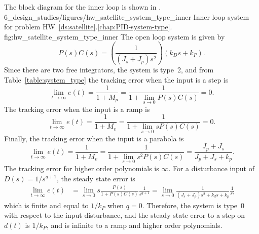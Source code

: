 
The block diagram for the inner loop is shown in .
	{6_design_studies/figures/hw_satellite_system_type_inner}
	{Inner loop system for problem HW~\ref{ds:satellite}.\ref{chap:PID-system-type}.}
	{fig:hw_satellite_system_type_inner}
The open loop system is given by
\[
P(s)C(s) = \left(\frac{1}{(J_s + J_p)s^2}\right)\left(k_Ds+k_P\right).
\]
Since there are two free integrators, the system is type~2, and from Table~\ref{table:system_type} the tracking error when the input is a step is \[
\lim_{t\to\infty}e(t) = \frac{1}{1+M_p} = \frac{1}{1+\lim_{s\to 0} P(s)C(s)} = 0.
\]
The tracking error when the input is a ramp is \[
\lim_{t\to\infty}e(t) = \frac{1}{1+M_v} = \frac{1}{1+\lim_{s\to 0} sP(s)C(s)} = 0.
\]
Finally, the tracking error when the input is a parabola is \[
\lim_{t\to\infty}e(t) = \frac{1}{1+M_v} = \frac{1}{1+\lim_{s\to 0} s^2P(s)C(s)} = \frac{J_p + J_s}{J_p + J_s + k_p}.
\]
The tracking error for higher order polynomials is $\infty$.
For a disturbance input of $D(s)=1/s^{q+1}$, the steady state error is
\begin{align*}
\lim_{t\to\infty}e(t) &= \lim_{s\to 0}s\frac{P(s)}{1+P(s)C(s)}\frac{1}{s^{q+1}} 
= \lim_{s\to 0}\frac{1}{(J_s+J_p)s^2+k_ds+k_p}\frac{1}{s^q}
\end{align*}
which is finite and equal to $1/k_P$ when $q=0$.  Therefore, the system is type~0 with respect to the input disturbance, and the steady state error to a step on $d(t)$ is $1/k_P$, and is infinite to a ramp and higher order polynomials.

